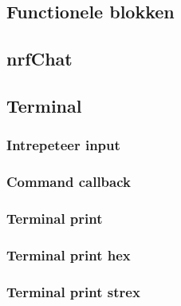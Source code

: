 \subsection{Functionele blokken}

\subsection{nrfChat}
    

\subsection{Terminal}
    \subsubsection{Intrepeteer input}
    \subsubsection{Command callback}
    \subsubsection{Terminal print}
    \subsubsection{Terminal print hex}
    \subsubsection{Terminal print strex}


    